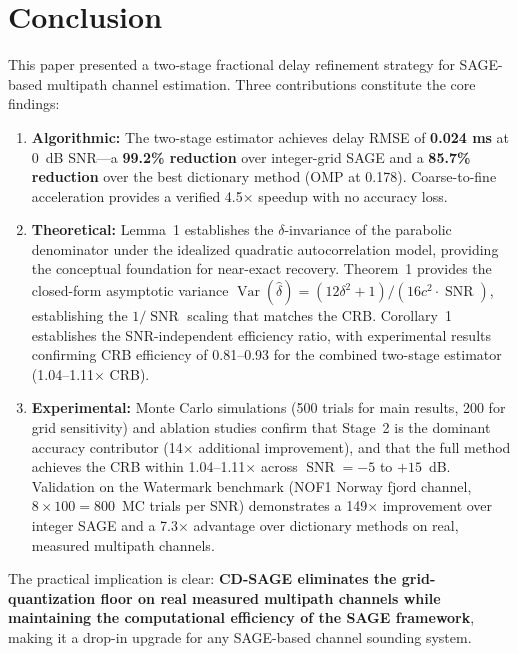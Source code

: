 \documentclass[a4paper,fleqn]{cas-dc}
\DeclareMathOperator{\Var}{Var}
\DeclareMathOperator{\SNR}{SNR}
\begin{document}
\section{Conclusion}
\label{sec:conclusion}

This paper presented a two-stage fractional delay refinement strategy for SAGE-based multipath channel estimation. Three contributions constitute the core findings:

\begin{enumerate}
\item \textbf{Algorithmic:} The two-stage estimator achieves delay RMSE of \textbf{0.024 ms} at 0~dB SNR---a \textbf{99.2\% reduction} over integer-grid SAGE and a \textbf{85.7\% reduction} over the best dictionary method (OMP at 0.178). Coarse-to-fine acceleration provides a verified 4.5$\times$ speedup with no accuracy loss.

\item \textbf{Theoretical:} Lemma~1 establishes the $\delta$-invariance of the parabolic denominator under the idealized quadratic autocorrelation model, providing the conceptual foundation for near-exact recovery. Theorem~1 provides the closed-form asymptotic variance $\Var(\hat{\delta}) = (12\delta^2+1)/(16c^2 \cdot \SNR)$, establishing the $1/\SNR$ scaling that matches the CRB. Corollary~1 establishes the SNR-independent efficiency ratio, with experimental results confirming CRB efficiency of 0.81--0.93 for the combined two-stage estimator (1.04--1.11$\times$ CRB).

\item \textbf{Experimental:} Monte Carlo simulations (500 trials for main results, 200 for grid sensitivity) and ablation studies confirm that Stage~2 is the dominant accuracy contributor (14$\times$ additional improvement), and that the full method achieves the CRB within 1.04--1.11$\times$ across $\SNR = -5$ to $+15$~dB. Validation on the Watermark benchmark (NOF1 Norway fjord channel, $8\times100 = 800$~MC trials per SNR) demonstrates a 149$\times$ improvement over integer SAGE and a 7.3$\times$ advantage over dictionary methods on real, measured multipath channels.
\end{enumerate}

The practical implication is clear: \textbf{CD-SAGE eliminates the grid-quantization floor on real measured multipath channels while maintaining the computational efficiency of the SAGE framework}, making it a drop-in upgrade for any SAGE-based channel sounding system.
\end{document}

